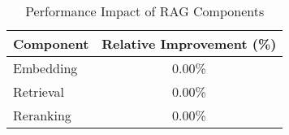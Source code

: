 \begin{table}[htbp]
\caption{Performance Impact of RAG Components}
\begin{center}
\begin{tabular}{|l|c|}
\hline
\textbf{Component} & \textbf{Relative Improvement (\%)} \\ 
\hline
Embedding & 0.00\% \\ 
Retrieval & 0.00\% \\ 
Reranking & 0.00\% \\ 
\hline
\end{tabular}
\label{tab:component_impact}
\end{center}
\end{table}

